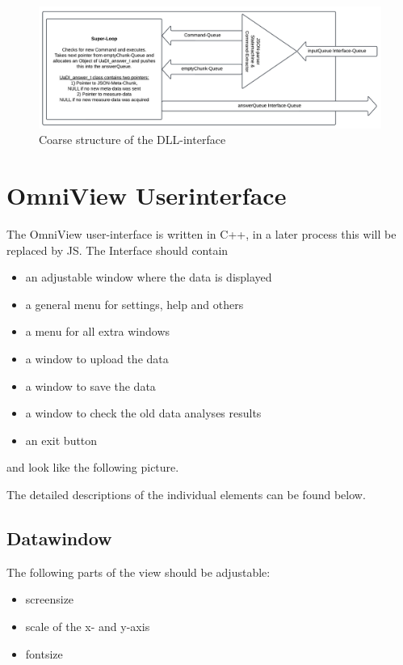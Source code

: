 \documentclass{scrreprt}
\begin{document}
\begin{figure}
    \includegraphics[width=.9\textwidth]{./assets/pictures/interface.pdf}
    \caption[]{Coarse structure of the DLL-interface}
    \label{fig:dllinterface}
\end{figure}

\section{OmniView Userinterface}

The OmniView user-interface is written in C++, in a later process this will be replaced by JS. The Interface should contain 

\begin{itemize}
    \item an adjustable window where the data is displayed
    \item a general menu for settings, help and others 
    \item a menu for all extra windows 
    \item a window to upload the data
    \item a window to save the data 
    \item a window to check the old data analyses results 
    \item an exit button
\end{itemize}

and look like the following picture. 

The detailed descriptions of the individual elements can be found below.

\subsection{Datawindow}

The following parts of the view should be adjustable: 

\begin{itemize}
    \item screensize
    \item scale of the x- and y-axis 
    \item fontsize 
\end{itemize}
\end{document}
